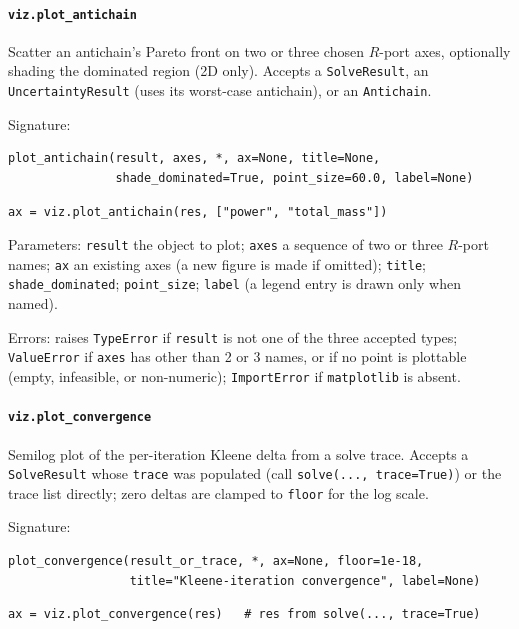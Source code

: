 \documentclass[11pt,a4paper]{article}
\begin{document}
\paragraph{\texttt{viz.plot\_antichain}}\label{ref:viz:plot_antichain}
Scatter an antichain's Pareto front on two or three chosen $R$-port axes,
optionally shading the dominated region (2D only). Accepts a
\texttt{SolveResult}, an \texttt{UncertaintyResult} (uses its worst-case
antichain), or an \texttt{Antichain}.

Signature:
\begin{lstlisting}
plot_antichain(result, axes, *, ax=None, title=None,
               shade_dominated=True, point_size=60.0, label=None)
\end{lstlisting}

\begin{lstlisting}
ax = viz.plot_antichain(res, ["power", "total_mass"])
\end{lstlisting}

Parameters: \texttt{result} the object to plot; \texttt{axes} a sequence of
two or three $R$-port names; \texttt{ax} an existing axes (a new figure is
made if omitted); \texttt{title}; \texttt{shade\_dominated}; \texttt{point\_size};
\texttt{label} (a legend entry is drawn only when named).

Errors: raises \texttt{TypeError} if \texttt{result} is not one of the
three accepted types; \texttt{ValueError} if \texttt{axes} has other than
2 or 3 names, or if no point is plottable (empty, infeasible, or
non-numeric); \texttt{ImportError} if \texttt{matplotlib} is absent.

\paragraph{\texttt{viz.plot\_convergence}}\label{ref:viz:plot_convergence}
Semilog plot of the per-iteration Kleene delta from a solve trace. Accepts
a \texttt{SolveResult} whose \texttt{trace} was populated (call
\texttt{solve(..., trace=True)}) or the trace list directly; zero deltas
are clamped to \texttt{floor} for the log scale.

Signature:
\begin{lstlisting}
plot_convergence(result_or_trace, *, ax=None, floor=1e-18,
                 title="Kleene-iteration convergence", label=None)
\end{lstlisting}

\begin{lstlisting}
ax = viz.plot_convergence(res)   # res from solve(..., trace=True)
\end{lstlisting}
\end{document}

